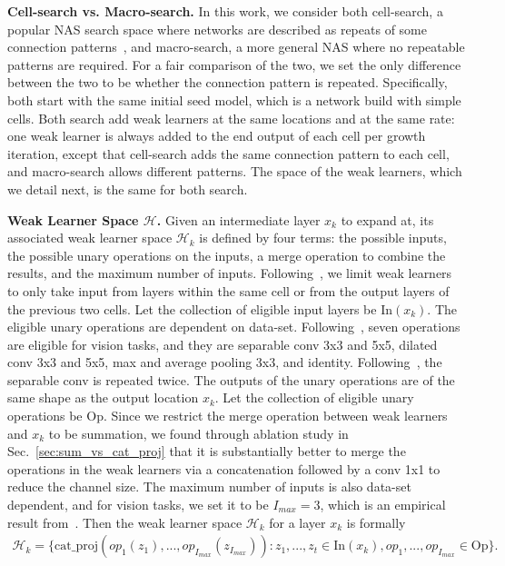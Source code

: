 \textbf{Cell-search vs. Macro-search.}
In this work, we consider both cell-search, 
a popular NAS search space where networks are described as repeats of some connection patterns~\citep{NASCell,Real2018RegularizedEF,Pham2018EfficientNA,Liu2018DARTSDA}, 
and macro-search, a more general NAS where no repeatable patterns are required. 
For a fair comparison of the two, we set the only difference between the two to be whether the connection pattern is repeated. Specifically, both start with the same initial seed model, which is a network build with simple cells.
Both search add weak learners at the same locations and at the same rate: one weak learner is always added to the end output of each cell per growth iteration, except that cell-search adds the same connection pattern to each cell, and macro-search allows different patterns. 
The space of the weak learners, which we detail next, is the same for both search. 



\textbf{Weak Learner Space $\mathcal{H}$.}
Given an intermediate layer $x_{k}$ to expand at, its associated weak learner space $\mathcal{H}_{k}$ is defined by four terms: the possible inputs, the
possible unary operations on the inputs, a merge operation to combine the results, and the maximum number of inputs. 
Following~\citep{NASCell,Real2018RegularizedEF,Liu2018DARTSDA}, we limit weak learners to only take input from layers within the same cell or from the output layers of the previous 
two cells. Let the collection of eligible input layers be $\text{In}(x_{k})$. 
The eligible unary operations are dependent on data-set. Following~\citep{Liu2018DARTSDA}, seven operations are eligible for vision tasks, and they are
separable conv 3x3 and 5x5, dilated conv 3x3 and 5x5, max and average pooling 3x3, and identity. Following~\citep{NASCell,Real2018RegularizedEF}, the separable conv is 
repeated twice. The outputs of the unary operations are of the same shape 
as the output location $x_k$. 
Let the collection of eligible unary operations be $\text{Op}$.
Since we restrict the merge operation between weak learners and $x_{k}$ to be summation, we found through ablation study in Sec.~\ref{sec:sum_vs_cat_proj} that
it is substantially better to merge the operations in the weak learners via a concatenation followed by a conv 1x1 to reduce the channel size. 
The maximum number of inputs is also data-set dependent, and for vision tasks, we set it to be $I_{max} = 3$, which is an empirical result from~\citep{darts_gumbel}.
Then the weak learner space $\mathcal{H}_{k}$ for a layer $x_{k}$ is formally 
\begin{align}
\mathcal{H}_{k} = \{ \text{cat\_proj}( op_1(z_1), ..., op_{I_{max}}(z_{I_{max}})) : z_1, ..., z_t \in \text{In}(x_{k}), op_1, ..., op_{I_{max}} \in \text{Op}  \}.
\end{align}



